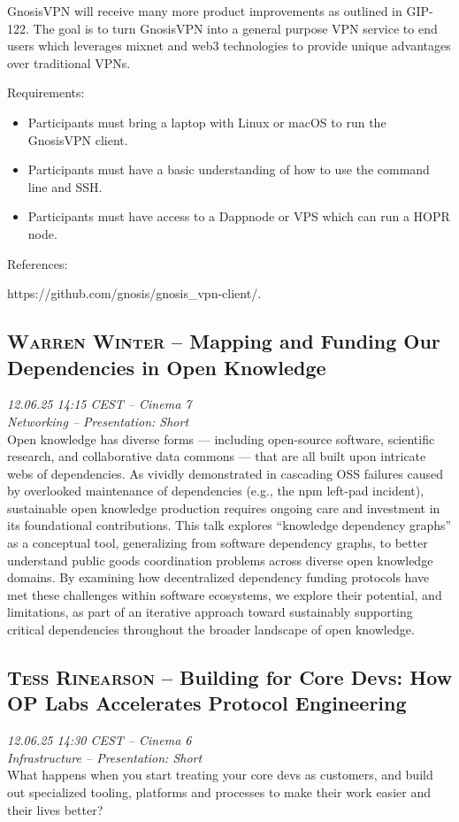 GnosisVPN will receive many more product improvements as outlined in GIP-122. The goal is to turn GnosisVPN into a general purpose VPN service to end users which leverages mixnet and web3 technologies to provide unique advantages over traditional VPNs.

Requirements:

\begin{itemize}
\item{} Participants must bring a laptop with Linux or macOS to run the GnosisVPN client.
\item{} Participants must have a basic understanding of how to use the command line and SSH.
\item{} Participants must have access to a Dappnode or VPS which can run a HOPR node.
\end{itemize}

References:

https://github.com/gnosis/gnosis\_vpn-client/.

\clearpage
\subsection {\textsc{Warren Winter}  -- Mapping and Funding Our Dependencies in Open Knowledge} \noindent \textit {12.06.25 14:15 CEST -- Cinema 7\\ Networking -- Presentation: Short}\\[1em] Open knowledge has diverse forms — including open-source software, scientific research, and collaborative data commons — that are all built upon intricate webs of dependencies.  As vividly demonstrated in cascading OSS failures caused by overlooked maintenance of dependencies (e.g., the npm left-pad incident), sustainable open knowledge production requires ongoing care and investment in its foundational contributions.  This talk explores ``knowledge dependency graphs'' as a conceptual tool, generalizing from software dependency graphs, to better understand public goods coordination problems across diverse open knowledge domains.  By examining how decentralized dependency funding protocols have met these challenges within software ecosystems, we explore their potential, and limitations, as part of an iterative approach toward sustainably supporting critical dependencies throughout the broader landscape of open knowledge.

\clearpage
\subsection {\textsc{Tess Rinearson}  -- Building for Core Devs: How OP Labs Accelerates Protocol Engineering} \noindent \textit {12.06.25 14:30 CEST -- Cinema 6\\ Infrastructure -- Presentation: Short}\\[1em] What happens when you start treating your core devs as customers, and build out specialized tooling, platforms and processes to make their work easier and their lives better?

